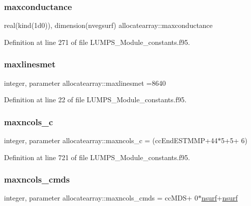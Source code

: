 \subsubsection{\texorpdfstring{maxconductance}{maxconductance}}
{\footnotesize\ttfamily real(kind(1d0)), dimension(nvegsurf) allocatearray\+::maxconductance}



Definition at line 271 of file L\+U\+M\+P\+S\+\_\+\+Module\+\_\+constants.\+f95.

\mbox{\label{namespaceallocatearray_af1e1f509de59466fc7517530d095f3c0}} 
\subsubsection{\texorpdfstring{maxlinesmet}{maxlinesmet}}
{\footnotesize\ttfamily integer, parameter allocatearray\+::maxlinesmet =8640}



Definition at line 22 of file L\+U\+M\+P\+S\+\_\+\+Module\+\_\+constants.\+f95.

\mbox{\label{namespaceallocatearray_a733b5ec7d7c0cf4c5407515ed555251f}} 
\subsubsection{\texorpdfstring{maxncols\+\_\+c}{maxncols\_c}}
{\footnotesize\ttfamily integer, parameter allocatearray\+::maxncols\+\_\+c = (cc\+End\+E\+S\+T\+M\+MP+44$\ast$5+5+ 6)}



Definition at line 721 of file L\+U\+M\+P\+S\+\_\+\+Module\+\_\+constants.\+f95.

\mbox{\label{namespaceallocatearray_ac7c54d53f039b450b99ecd7eab5ab826}} 
\subsubsection{\texorpdfstring{maxncols\+\_\+cmds}{maxncols\_cmds}}
{\footnotesize\ttfamily integer, parameter allocatearray\+::maxncols\+\_\+cmds = cc\+M\+DS+ 0$\ast$\hyperlink{namespaceallocatearray_acd22f92a06f7e9a2a91426b3dc99fdb0}{nsurf}+\hyperlink{namespaceallocatearray_acd22f92a06f7e9a2a91426b3dc99fdb0}{nsurf}}



